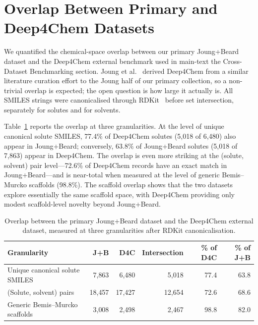 \documentclass[journal=jcisd8,manuscript=suppinfo]{achemso}
\begin{document}
\section{Overlap Between Primary and Deep4Chem Datasets}
\label{si:deep4chem_overlap}

We quantified the chemical-space overlap between our primary Joung+Beard dataset and the Deep4Chem external benchmark used in main-text the Cross-Dataset Benchmarking section. Joung et al.~\cite{joung2021deep} derived Deep4Chem from a similar literature curation effort to the Joung half of our primary collection, so a non-trivial overlap is expected; the open question is how large it actually is. All SMILES strings were canonicalised through RDKit~\cite{landrumRdkitRdkit2020_03_12020} before set intersection, separately for solutes and for solvents.

Table~\ref{tab:si_d4c_overlap} reports the overlap at three granularities. At the level of unique canonical solute SMILES, 77.4\% of Deep4Chem solutes (5{,}018 of 6{,}480) also appear in Joung+Beard; conversely, 63.8\% of Joung+Beard solutes (5{,}018 of 7{,}863) appear in Deep4Chem. The overlap is even more striking at the (solute, solvent) pair level---72.6\% of Deep4Chem records have an exact match in Joung+Beard---and is near-total when measured at the level of generic Bemis--Murcko scaffolds (98.8\%). The scaffold overlap shows that the two datasets explore essentially the same scaffold space, with Deep4Chem providing only modest scaffold-level novelty beyond Joung+Beard.

\begin{table}[htbp]
\centering
\caption{Overlap between the primary Joung+Beard dataset and the Deep4Chem external dataset, measured at three granularities after RDKit canonicalisation.}
\label{tab:si_d4c_overlap}
\small
\begin{tabular}{lrrrrr}
\toprule
\textbf{Granularity} & \textbf{J+B} & \textbf{D4C} & \textbf{Intersection} & \textbf{\% of D4C} & \textbf{\% of J+B} \\
\midrule
Unique canonical solute SMILES & 7{,}863 & 6{,}480 & 5{,}018 & 77.4 & 63.8 \\
(Solute, solvent) pairs & 18{,}457 & 17{,}427 & 12{,}654 & 72.6 & 68.6 \\
Generic Bemis--Murcko scaffolds & 3{,}008 & 2{,}498 & 2{,}467 & 98.8 & 82.0 \\
\bottomrule
\end{tabular}
\end{table}
\end{document}
